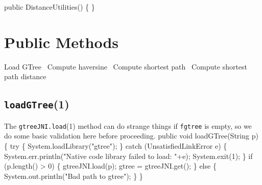 \documentclass{article}
\def\nwendcode{\endtrivlist \endgroup}
\let\nwdocspar=\par
\begin{document}
\nwenddocs{}\endmoddef{}
public DistanceUtilities() \{ \}
\nwendcode{}\nwdocspar

\section{Public Methods}
\nwenddocs{}\endmoddef{}
  \LA{}Load GTree~{\nwtagstyle{}}\RA{}
  \LA{}Compute haversine~{\nwtagstyle{}}\RA{}
  \LA{}Compute shortest path~{\nwtagstyle{}}\RA{}
  \LA{}Compute shortest path distance~{\nwtagstyle{}}\RA{}
\nwendcode{}\nwdocspar

\subsection{{\tt{}\protect{}\protect{}loadGTree}(1)}
The {\tt{}gtreeJNI.load}(1) method can do strange things if {\tt{}f{}gtree} is empty,
so we do some basic validation here before proceeding.
\nwenddocs{}\endmoddef{}
public void loadGTree(String p) \{
  try \{
    System.loadLibrary("gtree");
  \} catch (UnsatisfiedLinkError e) \{
    System.err.println("Native code library failed to load: "+e);
    System.exit(1);
  \}
  if (p.length() > 0) \{
    gtreeJNI.load(p);
    gtree = gtreeJNI.get();
  \} else \{
    System.out.println("Bad path to gtree");
  \}
\}
\eatline
{}\nwendcode{}\nwdocspar
\end{document}
